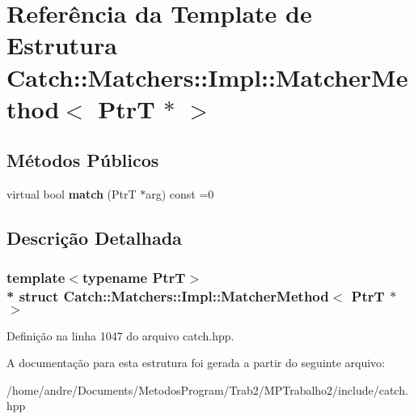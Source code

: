 \hypertarget{structCatch_1_1Matchers_1_1Impl_1_1MatcherMethod_3_01PtrT_01_5_01_4}{}\section{Referência da Template de Estrutura Catch\+:\+:Matchers\+:\+:Impl\+:\+:Matcher\+Method$<$ PtrT $\ast$ $>$}
\label{structCatch_1_1Matchers_1_1Impl_1_1MatcherMethod_3_01PtrT_01_5_01_4}
\subsection*{Métodos Públicos}
\begin{DoxyCompactItemize}
\item 
virtual bool {\bfseries match} (PtrT $\ast$arg) const =0\hypertarget{structCatch_1_1Matchers_1_1Impl_1_1MatcherMethod_3_01PtrT_01_5_01_4_a5fdd64f9509724f32ffc73cb320181d1}{}\label{structCatch_1_1Matchers_1_1Impl_1_1MatcherMethod_3_01PtrT_01_5_01_4_a5fdd64f9509724f32ffc73cb320181d1}

\end{DoxyCompactItemize}


\subsection{Descrição Detalhada}
\subsubsection*{template$<$typename PtrT$>$\\*
struct Catch\+::\+Matchers\+::\+Impl\+::\+Matcher\+Method$<$ Ptr\+T $\ast$ $>$}



Definição na linha 1047 do arquivo catch.\+hpp.



A documentação para esta estrutura foi gerada a partir do seguinte arquivo\+:\begin{DoxyCompactItemize}
\item 
/home/andre/\+Documents/\+Metodos\+Program/\+Trab2/\+M\+P\+Trabalho2/include/catch.\+hpp\end{DoxyCompactItemize}

